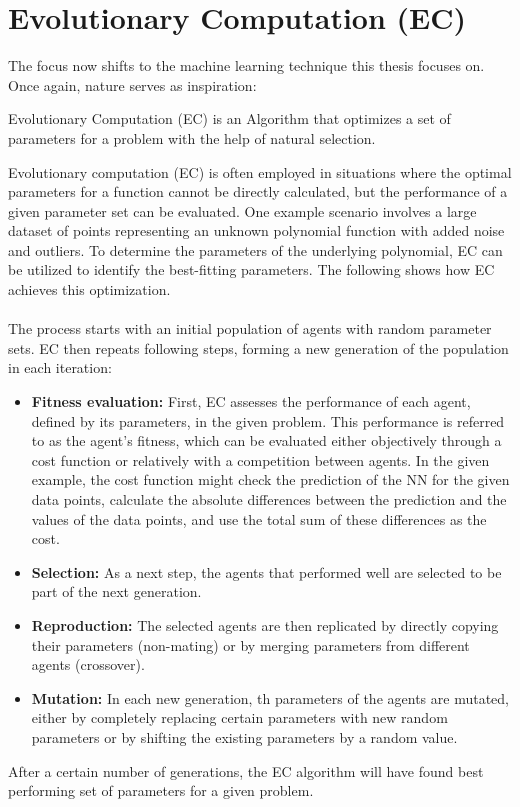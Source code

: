 \documentclass[11pt]{report}
\newcommand{\mydeflabel}{}
\newenvironment{mydef}[1]
{\renewcommand\mydeflabel{#1}\begin{mydefinner}}
{\end{mydefinner}}
\begin{document}
    \section{Evolutionary Computation (EC)}\label{sec:evolutionary-computation-(ec)-&-genetic-algorithms-(gas)}
    The focus now shifts to the machine learning technique this thesis focuses on.
    Once again, nature serves as inspiration:
    \begin{mydef}{Evolutionary Computation}
        Evolutionary Computation (EC) is an Algorithm that optimizes a set of parameters for a problem with the help of natural selection.
    \end{mydef}
    Evolutionary computation (EC) is often employed in situations where the optimal parameters for a function cannot be directly calculated, but the performance of a given parameter set can be evaluated.
    One example scenario involves a large dataset of points representing an unknown polynomial function with added noise and outliers.
    To determine the parameters of the underlying polynomial, EC can be utilized to identify the best-fitting parameters.
    The following shows how EC achieves this optimization.
    \\ \\
    The process starts with an initial population of agents with random parameter sets.
    EC then repeats following steps, forming a new generation of the population in each iteration:
    \begin{itemize}
        \item \textbf{Fitness evaluation:} First, EC assesses the performance of each agent, defined by its parameters, in the given problem.
        This performance is referred to as the agent's fitness, which can be evaluated either objectively through a cost function or relatively with a competition between agents.
        In the given example, the cost function might check the prediction of the NN for the given data points, calculate the absolute differences between the prediction and the values of the data points, and use the total sum of these differences as the cost.
        \item \textbf{Selection:} As a next step, the agents that performed well are selected to be part of the next generation.
        \item \textbf{Reproduction:} The selected agents are then replicated by directly copying their parameters (non-mating) or by merging parameters from different agents (crossover).
        \item \textbf{Mutation:} In each new generation, th parameters of the agents are mutated, either by completely replacing certain parameters with new random parameters or by shifting the existing parameters by a random value.
    \end{itemize}
    After a certain number of generations, the EC algorithm will have found best performing set of parameters for a given problem.
\end{document}

